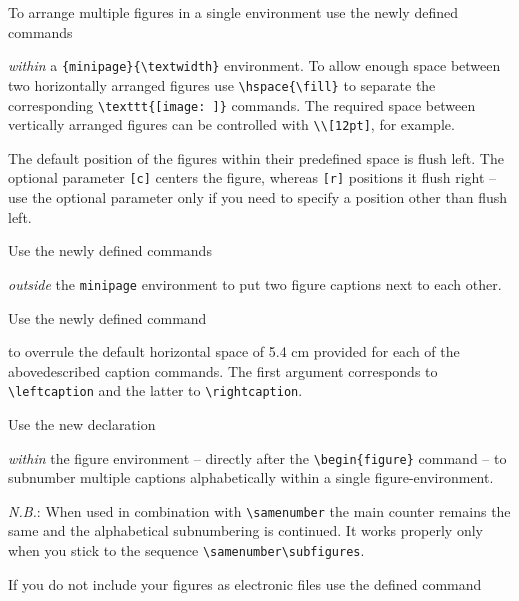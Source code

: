 \documentclass[graybox,square]{svmono}
\begin{document}
\begin{sloppy}
To arrange multiple figures in a single environment use the newly defined commands

\cprotect{}

{\it within} a \verb|{minipage}{\textwidth}| environment. To allow enough space between two horizontally arranged figures use \verb|\hspace{\fill}| to separate the corresponding \verb|\texttt{[image: ]}| commands. The required space between vertically arranged figures can be controlled with \verb|\\[12pt]|, for example.

The default position of the figures within their predefined space is flush left. The optional parameter \verb|[c]| centers the figure, whereas \verb|[r]| positions it flush right -- use the optional parameter only if you need to specify a position other than flush left.

Use the newly defined commands

\cprotect{}

{\it outside} the \verb|minipage| environment to put two figure captions next to each other.

\eject

Use the newly defined command

\cprotect{}

to overrule the default horizontal space of 5.4 cm provided for each of the abovedescribed caption commands. The first argument corresponds to \verb|\leftcaption| and the latter to \verb|\rightcaption|.

Use the new declaration

\cprotect\boxtext{\verb|\subfigures|}

{\it within} the figure environment -- directly after the \verb|\begin{figure}| command -- to subnumber multiple captions alphabetically within a single figure-environment.

{\it N.B.}: When used in combination with \verb|\samenumber| the main counter remains the same and the alphabetical subnumbering is continued. It works properly only when you stick to the sequence \verb|\samenumber\subfigures|.

If you do not include your figures as electronic files use the defined command


\end{sloppy}
\end{document}
